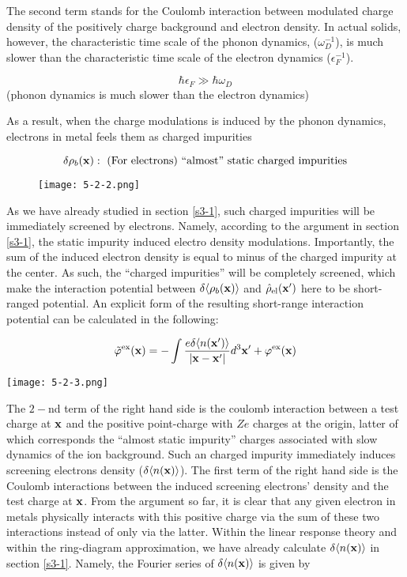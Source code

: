 The second term stands for the Coulomb interaction between modulated charge density of the positively charge background and electron density. In actual solids, however, the characteristic time scale of the phonon dynamics, ($\omega_D^{-1}$), is much slower than the characteristic time scale of the electron dynamics ($\epsilon_F^{-1}$). 

\[\hbar\epsilon_F\gg\hbar\omega_D \]
(phonon dynamics is much slower than the electron dynamics)

As a result, when the charge modulations is induced by the phonon dynamics, electrons in metal feels them as  charged impurities

\[\delta\rho_b({\bf x}):\text{ (For electrons) ``almost'' static charged impurities} \]
\begin{wrapfigure}{r}{6cm}
\texttt{[image: 5-2-2.png]}
\end{wrapfigure}
As we have already studied in section \ref{s3-1}, such charged impurities will be immediately screened by electrons. Namely, according to the argument in section \ref{s3-1}, the static impurity induced electro density modulations. Importantly, the sum of the induced electron density is equal to minus of the charged impurity at the center. As such, the ``charged impurities'' will be completely screened, which make the interaction potential between $\delta\langle\rho_b(\bf x)\rangle$ and $\hat{\rho}_{\text{el}}(\bf x')$ here to be short-ranged potential. An explicit form of the resulting short-range interaction potential can be calculated in the following:

\[\tilde\varphi^{\text{ex}}({\bf x})=-\int\frac{e\delta\langle n({\bf x}')\rangle}{|\bf x-x'|}d^3{\bf x'}+\varphi^{\text{ex}}({\bf x}) \]

\texttt{[image: 5-2-3.png]}

The $2-$nd term of the right hand side is the coulomb interaction between a test charge at $\bf x$ and the positive point-charge with $Ze$ charges at the origin, latter of which corresponds the ``almost static impurity'' charges associated with slow dynamics of the ion background. Such an charged impurity immediately induces screening electrons density ($\delta\langle n({\bf x})\rangle$). The first term of the right hand side is the Coulomb interactions between the induced screening electrons' density and the test charge at $\bf x$. From the argument so far, it is clear that any given electron in metals physically interacts with this positive charge via the sum of these two interactions instead of only via the latter. Within the linear response theory and within the ring-diagram approximation, we have already calculate $\delta\langle n({\bf x})\rangle$ in section \ref{s3-1}. Namely, the Fourier series of $\delta\langle n({\bf x})\rangle$ is given by

